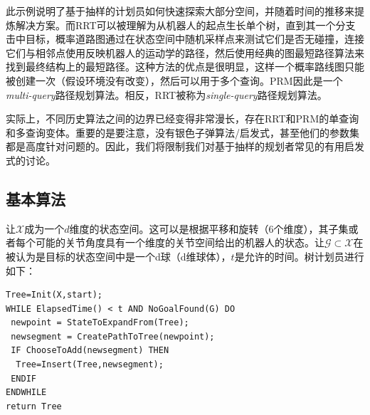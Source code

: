 
此示例说明了基于抽样的计划员如何快速探索大部分空间，并随着时间的推移来提炼解决方案。而RRT可以被理解为从机器人的起点生长单个树，直到其一个分支击中目标，概率道路图通过在状态空间中随机采样点来测试它们是否无碰撞，连接它们与相邻点使用反映机器人的运动学的路径，然后使用经典的图最短路径算法来找到最终结构上的最短路径。这种方法的优点是很明显，这样一个概率路线图只能被创建一次（假设环境没有改变），然后可以用于多个查询。PRM因此是一个\emph{multi-query}路径规划算法。相反，RRT被称为\emph{single-query}路径规划算法。

实际上，不同历史算法之间的边界已经变得非常漫长，存在RRT和PRM的单查询和多查询变体。重要的是要注意，没有银色子弹算法/启发式，甚至他们的参数集都是高度针对问题的。因此，我们将限制我们对基于抽样的规划者常见的有用启发式的讨论。


\subsection{基本算法}

让$\mathcal{X}$成为一个$d$维度的状态空间。这可以是根据平移和旋转（6个维度），其子集或者每个可能的关节角度具有一个维度的关节空间给出的机器人的状态。让$\mathcal{G}\subset\mathcal{X}$在被认为是目标的状态空间中是一个d球（d维球体），$t$是允许的时间。树计划员进行如下：

\begin{verbatim}
Tree=Init(X,start);
WHILE ElapsedTime() < t AND NoGoalFound(G) DO
 newpoint = StateToExpandFrom(Tree);
 newsegment = CreatePathToTree(newpoint);
 IF ChooseToAdd(newsegment) THEN
  Tree=Insert(Tree,newsegment);
 ENDIF
ENDWHILE
return Tree
\end{verbatim}

